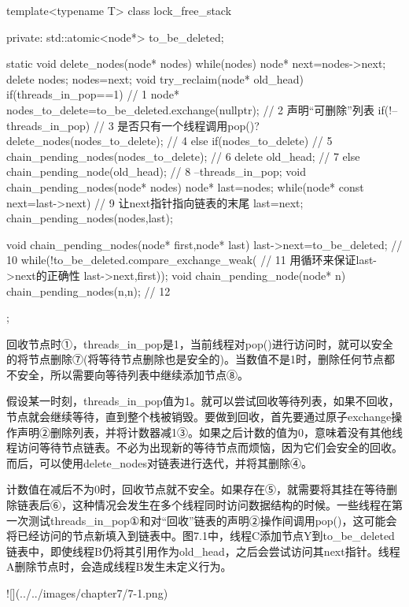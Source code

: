 \begin{cpp}
template<typename T>
class lock_free_stack
{
private:
  std::atomic<node*> to_be_deleted;

  static void delete_nodes(node* nodes)
  {
    while(nodes)
    {
      node* next=nodes->next;
      delete nodes;
      nodes=next;
    }
  }
  void try_reclaim(node* old_head)
  {
    if(threads_in_pop==1)  // 1
    {
      node* nodes_to_delete=to_be_deleted.exchange(nullptr);  // 2 声明“可删除”列表
      if(!--threads_in_pop)  // 3 是否只有一个线程调用pop()?
      {
        delete_nodes(nodes_to_delete);  // 4
      }
      else if(nodes_to_delete)  // 5
      {
         chain_pending_nodes(nodes_to_delete);  // 6
      }
      delete old_head;  // 7
    }
    else
    {
      chain_pending_node(old_head);  // 8
      --threads_in_pop;
    }
  }
  void chain_pending_nodes(node* nodes)
  {
    node* last=nodes;
    while(node* const next=last->next)  // 9 让next指针指向链表的末尾
    {
      last=next;
    }
    chain_pending_nodes(nodes,last);
  }

  void chain_pending_nodes(node* first,node* last)
  {
    last->next=to_be_deleted;  // 10
    while(!to_be_deleted.compare_exchange_weak(  // 11 用循环来保证last->next的正确性
      last->next,first));
    }
    void chain_pending_node(node* n)
    {
      chain_pending_nodes(n,n);  // 12
    }
};
\end{cpp}

回收节点时①，threads\_in\_pop是1，当前线程对pop()进行访问时，就可以安全的将节点删除⑦(将等待节点删除也是安全的)。当数值不是1时，删除任何节点都不安全，所以需要向等待列表中继续添加节点⑧。

假设某一时刻，threads\_in\_pop值为1。就可以尝试回收等待列表，如果不回收，节点就会继续等待，直到整个栈被销毁。要做到回收，首先要通过原子exchange操作声明②删除列表，并将计数器减1③。如果之后计数的值为0，意味着没有其他线程访问等待节点链表。不必为出现新的等待节点而烦恼，因为它们会安全的回收。而后，可以使用delete\_nodes对链表进行迭代，并将其删除④。

计数值在减后不为0时，回收节点就不安全。如果存在⑤，就需要将其挂在等待删除链表后⑥，这种情况会发生在多个线程同时访问数据结构的时候。一些线程在第一次测试threads\_in\_pop①和对“回收”链表的声明②操作间调用pop()，这可能会将已经访问的节点新填入到链表中。图7.1中，线程C添加节点Y到to\_be\_deleted链表中，即使线程B仍将其引用作为old\_head，之后会尝试访问其next指针。线程A删除节点时，会造成线程B发生未定义行为。

![](../../images/chapter7/7-1.png)

